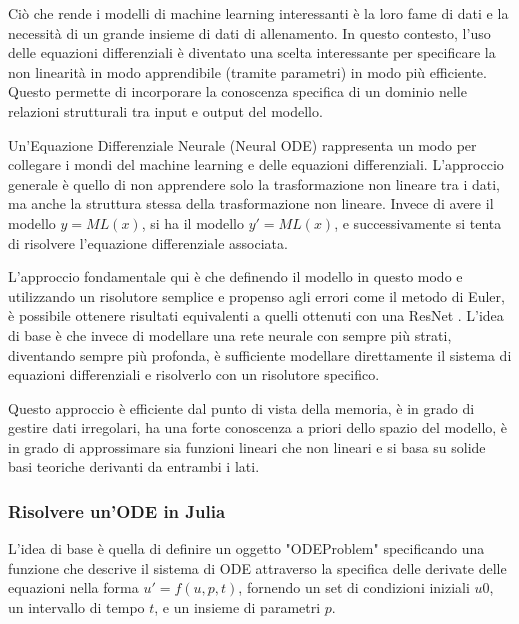 Ciò che rende i modelli di machine learning interessanti è la loro fame 
di dati e la necessità di un grande insieme di dati di allenamento. 
In questo contesto, l'uso delle equazioni differenziali è diventato 
una scelta interessante per specificare la non linearità in modo 
apprendibile (tramite parametri) in modo più efficiente. Questo permette 
di incorporare la conoscenza specifica di un dominio nelle relazioni 
strutturali tra input e output del modello.

Un'Equazione Differenziale Neurale (Neural ODE) rappresenta un modo per 
collegare i mondi del machine learning e delle equazioni differenziali. 
L'approccio generale è quello di non apprendere solo la trasformazione 
non lineare tra i dati, ma anche la struttura stessa della 
trasformazione non lineare. Invece di avere il modello $y = ML(x)$, 
si ha il modello $y' = ML(x)$, e successivamente si tenta di risolvere 
l'equazione differenziale associata.

L'approccio fondamentale qui è che definendo il modello in questo modo e 
utilizzando un risolutore semplice e propenso agli errori come il metodo 
di Euler, è possibile ottenere risultati equivalenti a quelli ottenuti 
con una ResNet \cite{he2015deep}. L'idea di base è che invece di 
modellare una rete neurale con sempre più strati, diventando sempre 
più profonda, è sufficiente modellare direttamente il sistema di 
equazioni differenziali e risolverlo con un risolutore specifico.

Questo approccio è efficiente dal punto di vista della memoria, è in 
grado di gestire dati irregolari, ha una forte conoscenza a priori 
dello spazio del modello, è in grado di approssimare sia funzioni 
lineari che non lineari e si basa su solide basi teoriche derivanti da 
entrambi i lati.

\subsubsection*{Risolvere un'ODE in Julia}

L'idea di base è quella di definire un oggetto "ODEProblem" specificando 
una funzione che descrive il sistema di ODE attraverso la specifica 
delle derivate delle equazioni nella forma $u' = f(u, p, t)$, fornendo 
un set di condizioni iniziali $u0$, un intervallo di tempo $t$, e un 
insieme di parametri $p$.


